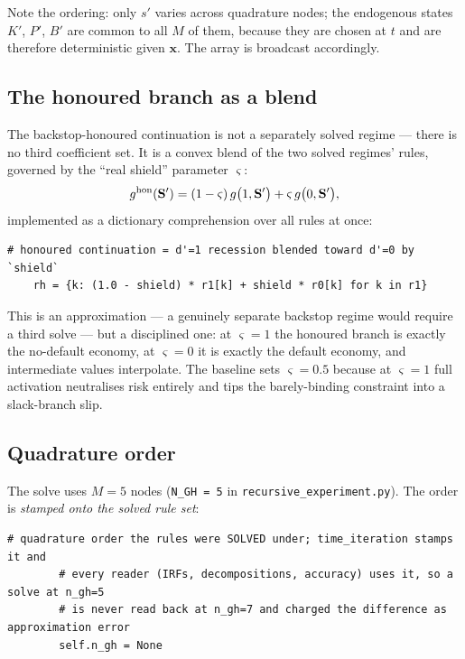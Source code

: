 \documentclass[11pt]{article}
\numberwithin{equation}{section}
\newcommand{\code}[1]{\texttt{\small #1}}
\newcommand{\bx}{\mathbf{x}}
\newcommand{\bS}{\mathbf{S}}
\theoremstyle{definition}
\theoremstyle{plain}
\theoremstyle{remark}
\begin{document}
Note the ordering: only $s'$ varies across quadrature nodes; the endogenous states
$K'$, $P'$, $B'$ are common to all $M$ of them, because they are chosen at $t$ and
are therefore deterministic given $\bx$. The array is broadcast accordingly.

\subsection{The honoured branch as a blend}

The backstop-honoured continuation is not a separately solved regime --- there is no
third coefficient set. It is a convex blend of the two solved regimes' rules,
governed by the ``real shield'' parameter $\varsigma$:
\begin{equation}
g^{\rm hon}(\bS')=(1-\varsigma)\,g\bigl(1,\bS'\bigr)+\varsigma\,g\bigl(0,\bS'\bigr),
\label{eq:blend}
\end{equation}
implemented as a dictionary comprehension over all rules at once:

\begin{lstlisting}[caption={The honoured branch. \code{point\_map.py}.}]
    # honoured continuation = d'=1 recession blended toward d'=0 by `shield`
    rh = {k: (1.0 - shield) * r1[k] + shield * r0[k] for k in r1}
\end{lstlisting}

This is an approximation --- a genuinely separate backstop regime would require a
third solve --- but a disciplined one: at $\varsigma=1$ the honoured branch is exactly
the no-default economy, at $\varsigma=0$ it is exactly the default economy, and
intermediate values interpolate. The baseline sets $\varsigma=0.5$ because at
$\varsigma=1$ full activation neutralises risk entirely and tips the barely-binding
constraint into a slack-branch slip.

\subsection{Quadrature order}

The solve uses $M=5$ nodes (\code{N\_GH = 5} in \code{recursive\_experiment.py}). The
order is \emph{stamped onto the solved rule set}:

\begin{lstlisting}[caption={Recording the quadrature order. \code{decision\_rules.py}, \code{RuleSet}.}]
        # quadrature order the rules were SOLVED under; time_iteration stamps it and
        # every reader (IRFs, decompositions, accuracy) uses it, so a solve at n_gh=5
        # is never read back at n_gh=7 and charged the difference as approximation error
        self.n_gh = None
\end{lstlisting}
\end{document}
